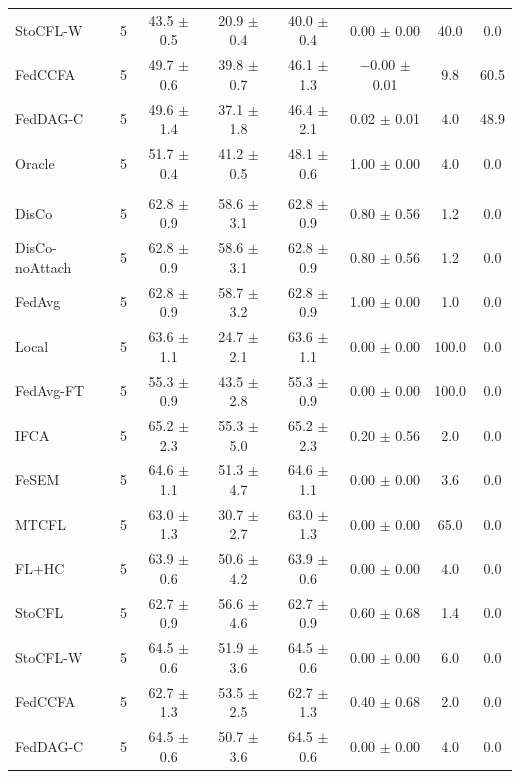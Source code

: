 {\begin{tabular}{l r c c c c c c}
StoCFL-W & 5 & 43.5 $\pm$ 0.5 & 20.9 $\pm$ 0.4 & 40.0 $\pm$ 0.4 & 0.00 $\pm$ 0.00 & 40.0 & 0.0 \\
FedCCFA & 5 & 49.7 $\pm$ 0.6 & 39.8 $\pm$ 0.7 & 46.1 $\pm$ 1.3 & $-$0.00 $\pm$ 0.01 & 9.8 & 60.5 \\
FedDAG-C & 5 & 49.6 $\pm$ 1.4 & 37.1 $\pm$ 1.8 & 46.4 $\pm$ 2.1 & 0.02 $\pm$ 0.01 & 4.0 & 48.9 \\
Oracle & 5 & 51.7 $\pm$ 0.4 & 41.2 $\pm$ 0.5 & 48.1 $\pm$ 0.6 & 1.00 $\pm$ 0.00 & 4.0 & 0.0 \\
\addlinespace
\multicolumn{8}{l}{\textit{FEMNIST}} \\
DisCo & 5 & 62.8 $\pm$ 0.9 & 58.6 $\pm$ 3.1 & 62.8 $\pm$ 0.9 & 0.80 $\pm$ 0.56 & 1.2 & 0.0 \\
DisCo-noAttach & 5 & 62.8 $\pm$ 0.9 & 58.6 $\pm$ 3.1 & 62.8 $\pm$ 0.9 & 0.80 $\pm$ 0.56 & 1.2 & 0.0 \\
FedAvg & 5 & 62.8 $\pm$ 0.9 & 58.7 $\pm$ 3.2 & 62.8 $\pm$ 0.9 & 1.00 $\pm$ 0.00 & 1.0 & 0.0 \\
Local & 5 & 63.6 $\pm$ 1.1 & 24.7 $\pm$ 2.1 & 63.6 $\pm$ 1.1 & 0.00 $\pm$ 0.00 & 100.0 & 0.0 \\
FedAvg-FT & 5 & 55.3 $\pm$ 0.9 & 43.5 $\pm$ 2.8 & 55.3 $\pm$ 0.9 & 0.00 $\pm$ 0.00 & 100.0 & 0.0 \\
IFCA & 5 & 65.2 $\pm$ 2.3 & 55.3 $\pm$ 5.0 & 65.2 $\pm$ 2.3 & 0.20 $\pm$ 0.56 & 2.0 & 0.0 \\
FeSEM & 5 & 64.6 $\pm$ 1.1 & 51.3 $\pm$ 4.7 & 64.6 $\pm$ 1.1 & 0.00 $\pm$ 0.00 & 3.6 & 0.0 \\
MTCFL & 5 & 63.0 $\pm$ 1.3 & 30.7 $\pm$ 2.7 & 63.0 $\pm$ 1.3 & 0.00 $\pm$ 0.00 & 65.0 & 0.0 \\
FL+HC & 5 & 63.9 $\pm$ 0.6 & 50.6 $\pm$ 4.2 & 63.9 $\pm$ 0.6 & 0.00 $\pm$ 0.00 & 4.0 & 0.0 \\
StoCFL & 5 & 62.7 $\pm$ 0.9 & 56.6 $\pm$ 4.6 & 62.7 $\pm$ 0.9 & 0.60 $\pm$ 0.68 & 1.4 & 0.0 \\
StoCFL-W & 5 & 64.5 $\pm$ 0.6 & 51.9 $\pm$ 3.6 & 64.5 $\pm$ 0.6 & 0.00 $\pm$ 0.00 & 6.0 & 0.0 \\
FedCCFA & 5 & 62.7 $\pm$ 1.3 & 53.5 $\pm$ 2.5 & 62.7 $\pm$ 1.3 & 0.40 $\pm$ 0.68 & 2.0 & 0.0 \\
FedDAG-C & 5 & 64.5 $\pm$ 0.6 & 50.7 $\pm$ 3.6 & 64.5 $\pm$ 0.6 & 0.00 $\pm$ 0.00 & 4.0 & 0.0 \\
\bottomrule
\end{tabular}
}
